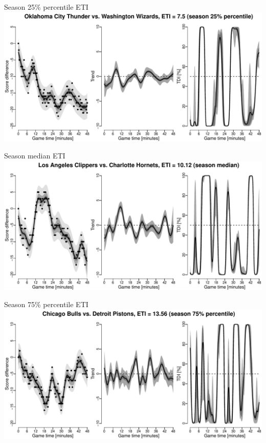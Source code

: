 \documentclass[ignorenonframetext,xcolor=pdflatex,table,dvipsnames,serif]{beamer}
\begin{document}
\begin{frame}{Season 25\% percentile ETI}
\includegraphics[scale=0.5]{fig4_2.pdf}
\end{frame}

\begin{frame}{Season median ETI}
\includegraphics[scale=0.5]{fig4_3.pdf}
\end{frame}

\begin{frame}{Season 75\% percentile ETI}
\includegraphics[scale=0.5]{fig4_4.pdf}
\end{frame}
\end{document}
